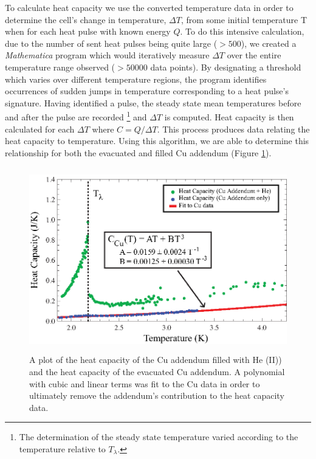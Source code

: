 To calculate heat capacity we use the converted temperature data in order to determine the cell's change in temperature, $\Delta T$, from some initial temperature T when for each heat pulse with known energy $Q$.  To do this intensive calculation, due to the number of sent heat pulses being quite large ($>500$), we created a \emph{Mathematica} program which would iteratively measure $\Delta T$ over the entire temperature range observed ($>50000$ data points).  By designating a threshold which varies over different temperature regions, the program identifies occurrences of sudden jumps in temperature corresponding to a heat pulse's signature. Having identified a pulse, the steady state mean temperatures before and after the pulse are recorded \footnote{The determination of the steady state temperature varied according to the temperature relative to $T_{\lambda}$.} and $\Delta T$ is computed.  Heat capacity is then calculated for each $\Delta T$ where $C=Q/\Delta T$.  This process produces data relating the heat capacity to temperature.  Using this algorithm, we are able to determine this relationship for both the evacuated and filled Cu addendum (Figure \ref{fig:lambdanorm}).


\begin{figure}[htbp]
\begin{center}
\includegraphics[height=80mm]{./figures/lambdanorm.eps}
\caption{\small{A plot of the heat capacity of the Cu addendum filled with He (II)) and the heat capacity of the evacuated Cu addendum.  A polynomial with cubic and linear terms was fit to the Cu data in order to ultimately remove the addendum's contribution to the heat capacity data.}}
\label{fig:lambdanorm}
\end{center}
\end{figure}

